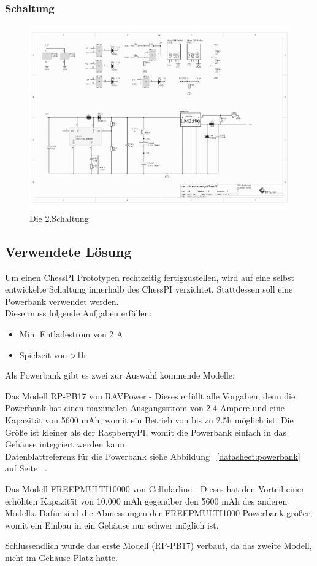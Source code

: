 \documentclass[12pt,a4paper]{article}
\begin{document}
{\subsubsection{Schaltung}
\label{SUBSUBSEC:CIRCUIT-2}
\begin{figure}[H]
  \centering
		\includegraphics[scale=0.7, angle=90]{graphics/20171104-shematics.pdf}
		\caption{Die 2.Schaltung}
		\label{fig:circuit2}
\end{figure}

\newpage
\subsection{Verwendete Lösung}
\label{SUBSEC:POWERBANK}

Um einen ChessPI Prototypen rechtzeitig fertigzustellen, wird auf eine selbst entwickelte Schaltung innerhalb des ChessPI verzichtet. Stattdessen soll eine Powerbank verwendet werden. \\
Diese muss folgende Aufgaben erfüllen:
\begin{itemize}
	\item{Min. Entladestrom von 2 A}
	\item{Spielzeit von >1h}
\end{itemize}

Als Powerbank gibt es zwei zur Auswahl kommende Modelle:
\begin{itemize}
	\item{Das Modell RP-PB17 von RAVPower - Dieses erfüllt alle Vorgaben, denn die Powerbank hat einen maximalen Ausgangsstrom von 2.4 Ampere und eine Kapazität von 5600 mAh, womit ein Betrieb von bis zu 2.5h möglich ist. Die Größe ist kleiner als der RaspberryPI, womit die Powerbank einfach in das Gehäuse integriert werden kann. \\
Datenblattreferenz für die Powerbank siehe Abbildung ~\ref{datasheet:powerbank} auf Seite ~\pageref{datasheet:powerbank}.
	\item{Das Modell FREEPMULTI10000 von Cellularline - Dieses hat den Vorteil einer erhöhten Kapazität von 10.000 mAh gegenüber den 5600 mAh des anderen Modells. Dafür sind die Abmessungen der FREEPMULTI1000 Powerbank größer, womit ein Einbau in ein Gehäuse nur schwer möglich ist.}
}
\end{itemize}
Schlussendlich wurde das erste Modell (RP-PB17) verbaut, da das zweite Modell, nicht im Gehäuse Platz hatte.

}
\end{document}
